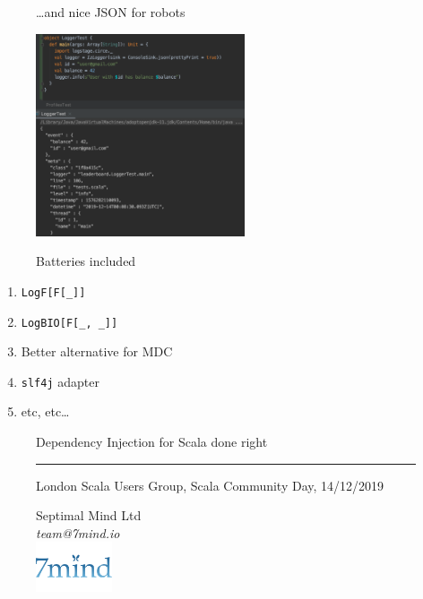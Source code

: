 \documentclass[usenames,dvipsnames,aspectratio=169]{beamer}
\begin{document}
\begin{frame}
  \begin{figure}
  \large \dots and nice JSON for robots
  \end{figure}

  \begin{figure}
    \includegraphics[width=0.55\textwidth]{media/json.png}
  \end{figure}
\end{frame}

\begin{frame}
  \begin{figure}
  \Huge Batteries included
  \end{figure}

  \begin{enumerate}
  \item \texttt{LogF[F[\_]]}
  \item \texttt{LogBIO[F[\_, \_]]}
  \item Better alternative for MDC
  \item \texttt{slf4j} adapter
  \item etc, etc\dots
  \end{enumerate}
\end{frame}


\begin{frame}
\begin{figure}
\color{RubineRed}
\Huge Dependency Injection for Scala done right

\rule{\linewidth}{1mm}

\normalsize London Scala Users Group, Scala Community Day, 14/12/2019
\end{figure}

\begin{figure}
  Septimal Mind Ltd \\
  \textit{team@7mind.io} \\
  \includegraphics[width=0.2\textwidth]{media/logo_7mind.png}
\end{figure}
\end{frame}
\end{document}
